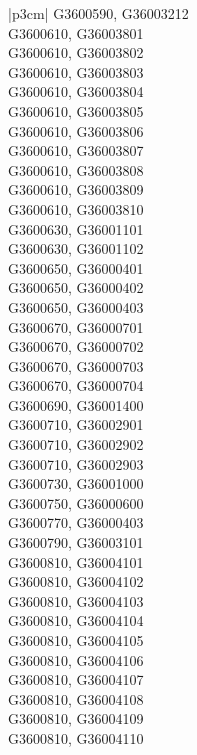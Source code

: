 \begin{customLongTable}{ |p{3cm}| }
G3600590, G36003212 \\ \hline
G3600610, G36003801 \\ \hline
G3600610, G36003802 \\ \hline
G3600610, G36003803 \\ \hline
G3600610, G36003804 \\ \hline
G3600610, G36003805 \\ \hline
G3600610, G36003806 \\ \hline
G3600610, G36003807 \\ \hline
G3600610, G36003808 \\ \hline
G3600610, G36003809 \\ \hline
G3600610, G36003810 \\ \hline
G3600630, G36001101 \\ \hline
G3600630, G36001102 \\ \hline
G3600650, G36000401 \\ \hline
G3600650, G36000402 \\ \hline
G3600650, G36000403 \\ \hline
G3600670, G36000701 \\ \hline
G3600670, G36000702 \\ \hline
G3600670, G36000703 \\ \hline
G3600670, G36000704 \\ \hline
G3600690, G36001400 \\ \hline
G3600710, G36002901 \\ \hline
G3600710, G36002902 \\ \hline
G3600710, G36002903 \\ \hline
G3600730, G36001000 \\ \hline
G3600750, G36000600 \\ \hline
G3600770, G36000403 \\ \hline
G3600790, G36003101 \\ \hline
G3600810, G36004101 \\ \hline
G3600810, G36004102 \\ \hline
G3600810, G36004103 \\ \hline
G3600810, G36004104 \\ \hline
G3600810, G36004105 \\ \hline
G3600810, G36004106 \\ \hline
G3600810, G36004107 \\ \hline
G3600810, G36004108 \\ \hline
G3600810, G36004109 \\ \hline
G3600810, G36004110 \\ \hline

\end{customLongTable}
